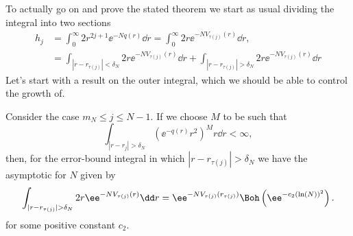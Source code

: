 To actually go on and prove the stated theorem we start as usual dividing the integral into two sections
\begin{align}
	h_j & = \int_{0}^{\infty} 2 r^{2j + 1} \ee^{-N q(r)} \dd r = \int_{0}^{\infty} 2 r \ee^{-N V_{\tau(j)} (r)} \dd r, \\
	&=\int_{|r - r_{\tau(j)}| < \delta_N} 2 r \ee^{-N V_{\tau(j)}(r)} \dd r+ \int_{|r - r_{\tau(j)}| > \delta_N} 2 r \ee^{-NV_{\tau(j)}(r)} \dd r
	\label{Equation: Separation disk}
\end{align}
 Let's start with a result on the outer integral, which we should be able to control the growth of. 

\begin{lema}  \label{Lemma: mn - N error contributing}
	Consider the case $m_N \leq j \leq N-1$.  If we choose $M$ to be such that
	\begin{equation}
		\int_{|r - r_j| > \delta_N} \left( \ee^{-q(r)} r^{2} \right)^M r \dd r < \infty,
	\end{equation}
	then, for the error-bound integral in which $|r - r_{\tau(j)}| > \delta_N$ we have the asymptotic for $N$ given by
	\begin{equation}
	\int_{|r - r_{\tau(j)}| > \delta_N} 2 r \ee^{-NV_{\tau(j)}(r)} \dd r = \ee^{-N V_{\tau(j)}(r_{\tau(j)})} \Boh\left(\ee^{-c_2 (\ln(N))^2}\right).
	\end{equation}
	for some positive constant $c_2$.
\end{lema}
